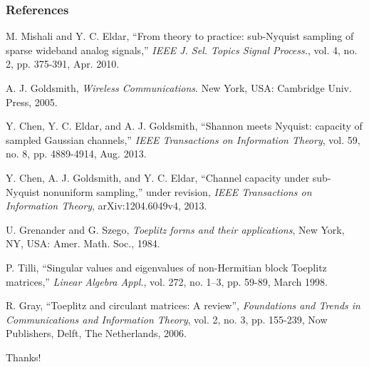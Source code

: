 \documentclass{beamer}
\begin{document}


\begin{frame}
\frametitle{References}
\scriptsize{
\begin{thebibliography}{1} %

    M. Mishali and Y. C. Eldar, ``From theory to practice: sub-Nyquist sampling of sparse wideband analog signals,'' \emph{IEEE J. Sel. Topics Signal Process.}, vol. 4, no. 2, pp. 375-391, Apr. 2010.

    A. J. Goldsmith, \emph{Wireless Communications}. New York, USA: Cambridge Univ. Press, 2005.

    Y. Chen, Y. C. Eldar, and A. J. Goldsmith, ``Shannon meets Nyquist: capacity of sampled Gaussian channels,'' \emph{IEEE Transactions on Information Theory}, vol. 59, no. 8, pp. 4889-4914, Aug. 2013.

  Y. Chen, A. J. Goldsmith, and Y. C. Eldar, ``Channel capacity under sub-Nyquist nonuniform sampling,'' under revision, \emph{IEEE Transactions on Information Theory}, arXiv:1204.6049v4, 2013.

    U. Grenander and G. Szego, \emph{Toeplitz forms and their applications}, New York, NY, USA: Amer. Math. Soc., 1984.

    P. Tilli, ``Singular values and eigenvalues of non-Hermitian block Toeplitz matrices,'' \emph{Linear Algebra Appl.}, vol. 272, no. 1–3, pp. 59-89, March 1998.

      R. Gray, ``Toeplitz and circulant matrices: A review'', \emph{Foundations and Trends in Communications and Information Theory}, vol. 2, no. 3, pp. 155-239, Now Publishers, Delft, The Netherlands, 2006.

\end{thebibliography}
}
\end{frame}


\begin{frame}
\Huge{\centerline{Thanks!}}
\end{frame}

\end{document}
